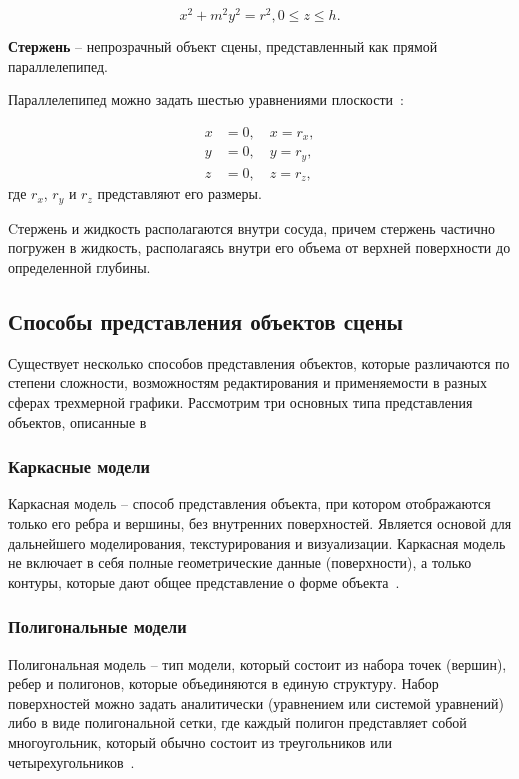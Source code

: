\begin{equation}
	x^2 + m^2y^2 = r^2, 0 \le z \le h.
\end{equation}\label{cyl}

\textbf{Стержень} -- непрозрачный объект сцены, представленный как прямой параллелепипед.

Параллелепипед можно задать шестью уравнениями плоскости~\cite[с.~143]{lengyel2011mathematics}:

\begin{align}
	x &= 0, \quad x = r_x, \\
	y &= 0, \quad y = r_y, \\
	z &= 0, \quad z = r_z,
\end{align}\label{box}
где $r_x$, $r_y$ и $r_z$ представляют его размеры.

Cтержень и жидкость располагаются внутри сосуда, причем стержень частично погружен в жидкость, располагаясь внутри его объема от верхней поверхности до определенной глубины.

\subsection{Способы представления объектов сцены}

Существует несколько способов представления объектов, которые различаются по степени сложности, возможностям редактирования и применяемости в разных сферах трехмерной графики. Рассмотрим три основных типа представления объектов, описанные в~\cite[c.~102]{vaughan2012digital}

\subsubsection{Каркасные модели}

Каркасная модель -- способ представления объекта, при котором отображаются только его ребра и вершины, без внутренних поверхностей. Является основой для дальнейшего моделирования, текстурирования и визуализации. Каркасная модель не включает в себя полные геометрические данные (поверхности), а только контуры, которые дают общее представление о форме объекта~\cite[С.~102, 107]{vaughan2012digital}.

\subsubsection{Полигональные модели}

Полигональная модель -- тип модели, который состоит из набора точек (вершин), ребер и полигонов, которые объединяются в единую структуру. Набор поверхностей можно задать аналитически (уравнением или системой уравнений) либо в виде полигональной сетки, где каждый полигон представляет собой многоугольник, который обычно состоит из треугольников или четырехугольников~\cite[c. 108]{vaughan2012digital}.

